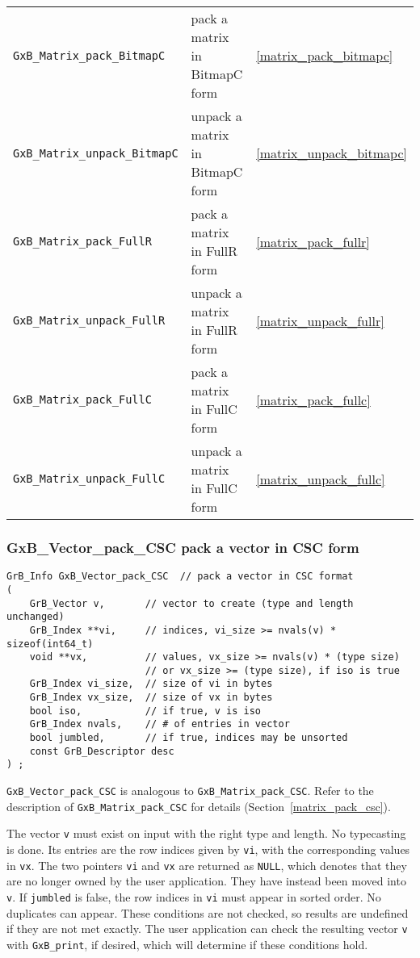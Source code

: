 \documentclass[12pt]{article}
\begin{document}
{\begin{tabular}{lll}
\hline
\verb'GxB_Matrix_pack_BitmapC'    & pack a matrix in BitmapC form & \ref{matrix_pack_bitmapc} \\
\verb'GxB_Matrix_unpack_BitmapC'  & unpack a matrix in BitmapC form & \ref{matrix_unpack_bitmapc} \\
\hline
\verb'GxB_Matrix_pack_FullR'      & pack a matrix in FullR form & \ref{matrix_pack_fullr} \\
\verb'GxB_Matrix_unpack_FullR'    & unpack a matrix in FullR form & \ref{matrix_unpack_fullr} \\
\hline
\verb'GxB_Matrix_pack_FullC'      & pack a matrix in FullC form & \ref{matrix_pack_fullc} \\
\verb'GxB_Matrix_unpack_FullC'    & unpack a matrix in FullC form & \ref{matrix_unpack_fullc} \\
\hline
\end{tabular}
}

\newpage
\subsubsection{{\sf GxB\_Vector\_pack\_CSC} pack a vector in CSC form}
\label{vector_pack_csc}

\begin{mdframed}[userdefinedwidth=6in]
{\footnotesize
\begin{verbatim}
GrB_Info GxB_Vector_pack_CSC  // pack a vector in CSC format
(
    GrB_Vector v,       // vector to create (type and length unchanged)
    GrB_Index **vi,     // indices, vi_size >= nvals(v) * sizeof(int64_t)
    void **vx,          // values, vx_size >= nvals(v) * (type size)
                        // or vx_size >= (type size), if iso is true
    GrB_Index vi_size,  // size of vi in bytes
    GrB_Index vx_size,  // size of vx in bytes
    bool iso,           // if true, v is iso
    GrB_Index nvals,    // # of entries in vector
    bool jumbled,       // if true, indices may be unsorted
    const GrB_Descriptor desc
) ;
\end{verbatim}
} \end{mdframed}

\noindent
\verb'GxB_Vector_pack_CSC' is analogous to \verb'GxB_Matrix_pack_CSC'.
Refer to the description of \verb'GxB_Matrix_pack_CSC' for details
(Section~\ref{matrix_pack_csc}).

The vector \verb'v' must
exist on input with the right type and length.  No typecasting is done.
Its entries are
the row indices given by \verb'vi', with the corresponding values in \verb'vx'.
The two pointers \verb'vi' and \verb'vx' are returned as \verb'NULL', which
denotes that they are no longer owned by the user application.  They have
instead been moved into \verb'v'.  If \verb'jumbled'
is false, the row indices in \verb'vi' must appear in sorted order.  No
duplicates can appear.  These conditions are not checked, so results are
undefined if they are not met exactly.  The user application can check the
resulting vector \verb'v' with \verb'GxB_print', if desired, which will
determine if these conditions hold.
\end{document}
